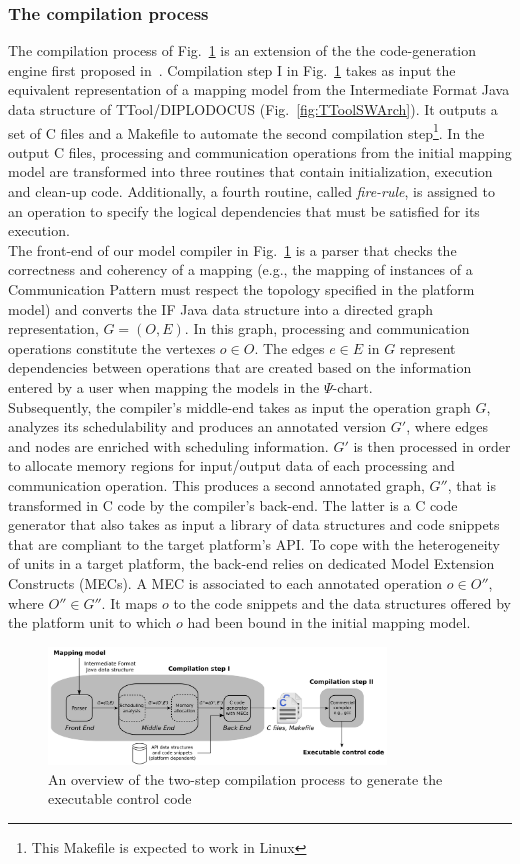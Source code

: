 \documentclass{llncs}
\begin{document}
\subsubsection{The compilation process}
%
The compilation process of Fig.~\ref{fig:CodeGen} is an extension of the the code-generation engine first proposed
in~\cite{Gonzalez13}. Compilation step I in Fig.~\ref{fig:CodeGen} takes as input the equivalent representation of a
mapping model from the Intermediate Format Java data structure of TTool/DIPLODOCUS (Fig.~\ref{fig:TToolSWArch}). It
outputs a set of C files and a Makefile to automate the second compilation step\footnote{This Makefile is expected to work in Linux}. In the output C files, processing and
communication operations from the initial mapping model are transformed into three routines that contain initialization,
execution and clean-up code. Additionally, a fourth routine, called \textit{fire-rule}, is assigned to an operation to
specify the logical dependencies that must be satisfied for its execution.\\
%
The front-end of our model compiler in Fig.~\ref{fig:CodeGen} is a parser that checks the correctness and coherency of a
mapping (e.g., the mapping of instances of a Communication Pattern must respect the topology specified in
the platform model) and converts the IF Java data structure into a directed graph representation, $G = (O,E)$. In this
graph, processing and communication operations constitute the vertexes $o \in O$. The edges $e \in E$ in $G$ represent
dependencies between operations that are created based on the information entered by a user when mapping the models in
the $\Psi$-chart.\\
%
Subsequently, the compiler's middle-end takes as input the operation graph $G$, analyzes its schedulability and produces
an annotated version $G'$, where edges and nodes are enriched with scheduling information. $G'$ is then
processed in order to allocate memory regions for input/output data of each processing and communication operation.
This produces a second annotated graph, $G''$, that is transformed in C code by the compiler's back-end. The latter is a
C code generator that also takes as input a library of data structures and code snippets that are compliant to the
target platform's API. To cope with the heterogeneity of units in a target platform, the back-end relies on dedicated
Model Extension Constructs (MECs). A MEC is associated to each annotated operation $o \in O''$, where $O'' \in G''$. It
maps $o$ to the code snippets and the data structures offered by the platform unit to which $o$ had been bound in the
initial mapping model.
%
\begin{figure}[htbp]
	\centering
 	\includegraphics[width=0.8\textwidth]{figures/ModelCompiler.pdf}
	\caption{An overview of the two-step compilation process to generate the executable control code}
	\label{fig:CodeGen}
\end{figure}
%
%
\end{document}
